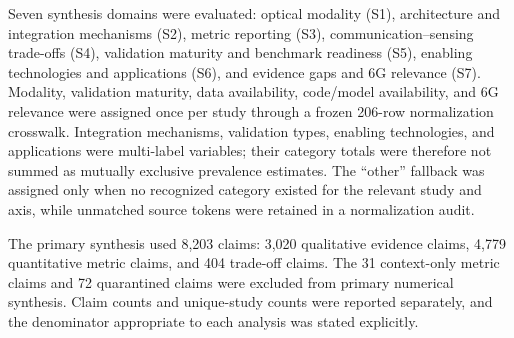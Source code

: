 Seven synthesis domains were evaluated: optical modality (S1), architecture
and integration mechanisms (S2), metric reporting (S3), communication--sensing
trade-offs (S4), validation maturity and benchmark readiness (S5), enabling
technologies and applications (S6), and evidence gaps and 6G relevance (S7).
Modality, validation maturity, data availability, code/model availability, and
6G relevance were assigned once per study through a frozen 206-row
normalization crosswalk. Integration mechanisms, validation types, enabling
technologies, and applications were multi-label variables; their category
totals were therefore not summed as mutually exclusive prevalence estimates.
The ``other'' fallback was assigned only when no recognized category existed
for the relevant study and axis, while unmatched source tokens were retained
in a normalization audit.

The primary synthesis used 8,203 claims: 3,020 qualitative evidence claims,
4,779 quantitative metric claims, and 404 trade-off claims. The 31 context-only
metric claims and 72 quarantined claims were excluded from primary numerical
synthesis. Claim counts and unique-study counts were reported separately, and
the denominator appropriate to each analysis was stated explicitly.
